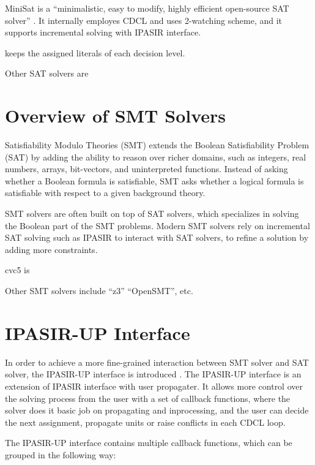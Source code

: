 MiniSat is a ``minimalistic, easy to modify, highly efficient open-source SAT solver'' . It internally employes CDCL and uses 2-watching scheme, and it supports incremental solving with IPASIR interface.

 keeps the assigned literals of each decision level.




Other SAT solvers are 

\section{Overview of SMT Solvers}

Satisfiability Modulo Theories (SMT) extends the Boolean Satisfiability Problem (SAT) by adding the ability to reason over richer domains, such as integers, real numbers, arrays, bit-vectors, and uninterpreted functions. Instead of asking whether a Boolean formula is satisfiable, SMT asks whether a logical formula is satisfiable with respect to a given background theory.

SMT solvers are often built on top of SAT solvers, which specializes in solving the Boolean part of the SMT problems. Modern SMT solvers rely on incremental SAT solving such as IPASIR to interact with SAT solvers, to refine a solution by adding more constraints.

cvc5 is 

Other SMT solvers include ``z3'' ``OpenSMT'', etc.

\section{IPASIR-UP Interface}

In order to achieve a more fine-grained interaction between SMT solver and SAT solver, the IPASIR-UP interface is introduced \cite{fazekas_et_al:LIPIcs.SAT.2023.8}. The IPASIR-UP interface is an extension of IPASIR interface with user propagater. It allows more control over the solving process from the user with a set of callback functions, where the solver does it basic job on propagating and inprocessing, and the user can decide the next assignment, propagate units or raise conflicts in each CDCL loop.

The IPASIR-UP interface contains multiple callback functions, which can be grouped in the following way:

